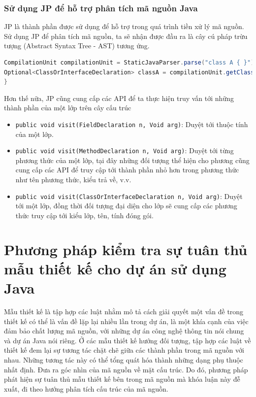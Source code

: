 \documentclass[12pt]{report}
\begin{document}
\subsection{Sử dụng JP để hỗ trợ phân tích mã nguồn Java}
JP là thành phần được sử dụng để hỗ trợ trong quá trình tiền xử lý mã nguồn. Sử dụng JP để phân tích mã nguồn, ta sẽ nhận được đầu ra là cây cú pháp trừu tượng (Abstract Syntax Tree - AST) tương ứng.
\begin{lstlisting}[language=Java,
caption={Sử dụng API của JS Core để tạo cây cú pháp trúc trừu tượng},label={code:jdt-ast-gen}]
CompilationUnit compilationUnit = StaticJavaParser.parse("class A { }");
Optional<ClassOrInterfaceDeclaration> classA = compilationUnit.getClassByName("A");
}
\end{lstlisting}
Hơn thế nữa, JP cũng cung cấp các API để ta thực hiện truy vấn tới những thành phần của một lớp trên cây cấu trúc
\begin{itemize}
	\item \texttt{public void visit(FieldDeclaration n, Void arg)}: Duyệt tới thuộc tính của một lớp.
	\item \texttt{public void visit(MethodDeclaration n, Void arg)}: Duyệt tới từng phương thức của một lớp, tại đây những đối tượng thể hiện cho phương cũng cung cấp các API để truy cập tới thành phần nhỏ hơn trong phương thức như tên phương thức, kiểu trả về, v.v.
	\item \texttt{public void visit(ClassOrInterfaceDeclaration n, Void arg)}: Duyệt tới một lớp, đồng thời đối tượng đại diện cho lớp sẽ cung cấp các phương thức truy cập tới kiểu lớp, tên, tính đóng gói.
\end{itemize}
\chapter{Phương pháp kiểm tra sự tuân thủ mẫu thiết kế cho dự án sử dụng Java}\noindent Mẫu thiết kế là tập hợp các luật nhằm mô tả cách giải quyết một vấn đề trong thiết kế có thể là vấn đề lặp lại nhiều lần trong dự án, là một khía cạnh của việc đảm bảo chất lượng mã nguồn, với những dự án công nghệ thông tin nói chung và dự án Java nói riêng. Ở các mẫu thiết kế hướng đối tượng, tập hợp các luật về thiết kế đem lại sự tương tác chặt chẽ giữa các thành phần trong mã nguồn với nhau. Những tương tác này có thể tổng quát hóa thành những dạng phụ thuộc nhất định. Đưa ra góc nhìn của mã nguồn về mặt cấu trúc. Do đó, phương pháp phát hiện sự tuân thủ mẫu thiết kế bên trong mã nguồn mà khóa luận này đễ xuất, đi theo hướng phân tích cấu trúc của mã nguồn.\\
\end{document}
